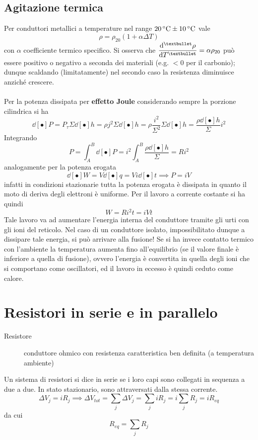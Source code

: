 \subsection{Agitazione termica}
Per conduttori metallici a temperature nel range $20\celsius \pm 10\celsius$ vale
\[\rho = \rho_{20} (1 + \alpha \Delta T)\]
con $\alpha$ coefficiente termico specifico. Si osserva che $\ds \dv[•]{\rho}{T} = \alpha \rho_{20}$ può essere positivo o negativo a seconda dei materiali (e.g. $<0$ per il carbonio); dunque scaldando (limitatamente) nel secondo caso la resistenza diminuisce anziché crescere.
\\~\\
Per la potenza dissipata per \textbf{effetto Joule} considerando sempre la porzione cilindrica si ha
\[\dd[•]{P} = P_\tau \Sigma \dd[•]{h} = \rho j^2 \Sigma \dd[•]{h} = \rho \frac{i^2}{\Sigma^2} \Sigma \dd[•]{h} = \frac{\rho \dd[•]{h}}{\Sigma} i^2\]
Integrando
\[P = \int_A^B \dd[•]{P} = i^2 \int_A^B \frac{\rho \dd[•]{h}}{\Sigma} = R i^2\]
analogamente per la potenza erogata
\[\dd[•]{W} = V \dd[•]{q} = V i \dd[•]{t} \implies P = i V\]
infatti in condizioni stazionarie tutta la potenza erogata è dissipata in quanto il moto di deriva degli elettroni è uniforme. Per il lavoro a corrente costante si ha quindi
\[W = R i^2 t = i V t\]
Tale lavoro va ad aumentare l'energia interna del conduttore tramite gli urti con gli ioni del reticolo. Nel caso di un conduttore isolato, impossibilitato dunque a dissipare tale energia, si può arrivare alla fusione! Se si ha invece contatto termico con l'ambiente la temperatura aumenta fino all'equilibrio (se il valore finale è inferiore a quella di fusione), ovvero l'energia è convertita in quella degli ioni che si comportano come oscillatori, ed il lavoro in eccesso è quindi ceduto come calore.

\section{Resistori in serie e in parallelo}
\begin{description}
\item[Resistore] conduttore ohmico con resistenza caratteristica ben definita (a temperatura ambiente)
\end{description}

Un sistema di resistori si dice in serie se i loro capi sono collegati in sequenza a due a due. In stato stazionario, sono attraversati dalla stessa corrente.
\[\Delta V_j = i R_j \implies \Delta V_{tot} = \sum_j \Delta V_j = \sum_j i R_j = i \sum_j R_j = i R_{eq} \]
da cui
\[R_{eq} = \sum_j R_j\]

